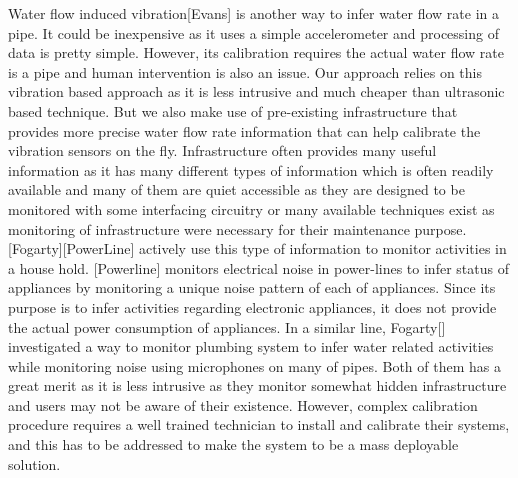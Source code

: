 Water flow induced vibration[Evans] is another way to infer water flow rate in a pipe. It could be inexpensive as it uses a simple accelerometer and processing of data is pretty simple. However, its calibration requires the actual water flow rate is a pipe and human intervention is also an issue. Our approach relies on this vibration based approach as it is less intrusive and much cheaper than ultrasonic based technique. But we also make use of pre-existing infrastructure that provides more precise water flow rate information that can help calibrate the vibration sensors on the fly. 
Infrastructure often provides many useful information as it has many different types of information which is often readily available and many of them are quiet accessible as they are designed to be monitored with some interfacing circuitry or many available techniques exist as monitoring of infrastructure were necessary for their maintenance purpose. [Fogarty][PowerLine] actively use this type of information to monitor activities in a house hold. [Powerline] monitors electrical noise in power-lines to infer status of appliances by monitoring a unique noise pattern of each of appliances. Since its purpose is to infer activities regarding electronic appliances, it does not provide the actual power consumption of appliances. In a similar line, Fogarty[] investigated a way to monitor plumbing system to infer water related activities while monitoring noise using microphones on many of pipes. Both of them has a great merit as it is less intrusive as they monitor somewhat hidden infrastructure and users may not be aware of their existence. However, complex calibration procedure requires a well trained technician to install and calibrate their systems, and this has to be addressed to make the system to be a mass deployable solution.
